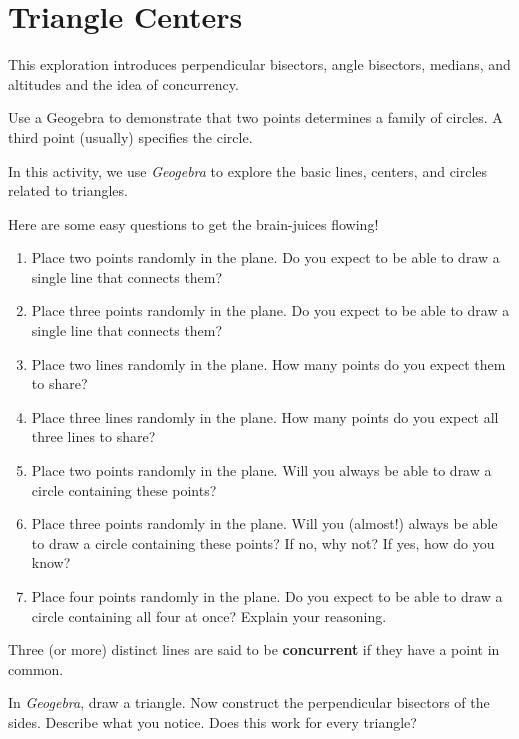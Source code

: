 \newpage
\section{Triangle Centers}
\begin{teachingnote}
This exploration introduces perpendicular bisectors, angle bisectors, medians, and altitudes and the idea of concurrency.  

Use a Geogebra to demonstrate that two points determines a family of circles.  A third point (usually) specifies the circle.
\end{teachingnote}

In this activity, we use \textsl{Geogebra} to explore the basic lines, centers, and circles related to triangles.  

\begin{prob} Here are some easy questions to get the brain-juices flowing!
\begin{enumerate} 
\itemsep -3pt
\item Place two points randomly in the plane. Do you expect to be able to
draw a single line that connects them?
\item Place three points randomly in the plane. Do you expect to be able to
draw a single line that connects them?
\item Place two lines randomly in the plane. How many points do you expect
them to share?
\item Place three lines randomly in the plane. How many points do you expect
all three lines to share?
\item Place two points randomly in the plane. Will you always be
able to draw a circle containing these points?
\item Place three points randomly in the plane. Will you (almost!) always be
able to draw a circle containing these points? If no, why not? If yes,
how do you know?
\item Place four points randomly in the plane. Do you expect to be able to
draw a circle containing all four at once? Explain your reasoning.
\end{enumerate}
\end{prob}

\begin{definition}
Three (or more) distinct lines are said to be \textbf{concurrent} if they have a point in common.  
\end{definition}

\begin{prob} 
In \textsl{Geogebra}, draw a triangle. Now construct the perpendicular bisectors of
the sides.  Describe what you notice.  Does this work for every triangle?
\end{prob}


